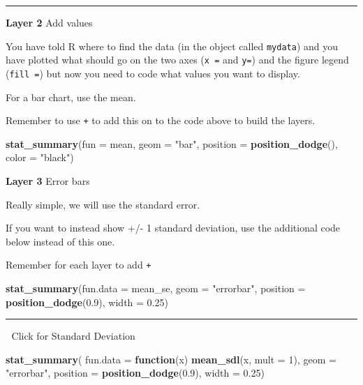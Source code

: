 \documentclass[
]{book}
\newenvironment{Shaded}{\begin{snugshade}}{\end{snugshade}}
\newcommand{\AttributeTok}[1]{\textcolor[rgb]{0.13,0.29,0.53}{#1}}
\newcommand{\ControlFlowTok}[1]{\textcolor[rgb]{0.13,0.29,0.53}{\textbf{#1}}}
\newcommand{\DecValTok}[1]{\textcolor[rgb]{0.00,0.00,0.81}{#1}}
\newcommand{\FloatTok}[1]{\textcolor[rgb]{0.00,0.00,0.81}{#1}}
\newcommand{\FunctionTok}[1]{\textcolor[rgb]{0.13,0.29,0.53}{\textbf{#1}}}
\newcommand{\NormalTok}[1]{#1}
\newcommand{\StringTok}[1]{\textcolor[rgb]{0.31,0.60,0.02}{#1}}
\begin{document}
\begin{center}\rule{0.5\linewidth}{0.5pt}\end{center}

\textbf{Layer 2} Add values

You have told R where to find the data (in the object called \texttt{mydata}) and you have plotted what should go on the two axes (\texttt{x\ =} and \texttt{y=}) and the figure legend (\texttt{fill\ =}) but now you need to code what values you want to display.

For a bar chart, use the mean.

Remember to use \texttt{+} to add this on to the code above to build the layers.

\begin{Shaded}
\begin{Highlighting}[]
\FunctionTok{stat\_summary}\NormalTok{(}\AttributeTok{fun =}\NormalTok{ mean, }\AttributeTok{geom =} \StringTok{"bar"}\NormalTok{,}
            \AttributeTok{position =} \FunctionTok{position\_dodge}\NormalTok{(), }\AttributeTok{color =} \StringTok{"black"}\NormalTok{)}
\end{Highlighting}
\end{Shaded}

\textbf{Layer 3} Error bars

Really simple, we will use the standard error.

If you want to instead show +/- 1 standard deviation, use the additional code below instead of this one.

Remember for each layer to add \texttt{+}

\begin{Shaded}
\begin{Highlighting}[]
\FunctionTok{stat\_summary}\NormalTok{(}\AttributeTok{fun.data =}\NormalTok{ mean\_se, }\AttributeTok{geom =} \StringTok{"errorbar"}\NormalTok{, }
            \AttributeTok{position =} \FunctionTok{position\_dodge}\NormalTok{(}\FloatTok{0.9}\NormalTok{), }\AttributeTok{width =} \FloatTok{0.25}\NormalTok{) }
\end{Highlighting}
\end{Shaded}

\begin{center}\rule{0.5\linewidth}{0.5pt}\end{center}

👀 Click for Standard Deviation

\begin{Shaded}
\begin{Highlighting}[]
\FunctionTok{stat\_summary}\NormalTok{(}
  \AttributeTok{fun.data =} \ControlFlowTok{function}\NormalTok{(x) }\FunctionTok{mean\_sdl}\NormalTok{(x, }\AttributeTok{mult =} \DecValTok{1}\NormalTok{),}
  \AttributeTok{geom =} \StringTok{"errorbar"}\NormalTok{,}
  \AttributeTok{position =} \FunctionTok{position\_dodge}\NormalTok{(}\FloatTok{0.9}\NormalTok{),}
  \AttributeTok{width =} \FloatTok{0.25}\NormalTok{)}
\end{Highlighting}
\end{Shaded}
\end{document}
